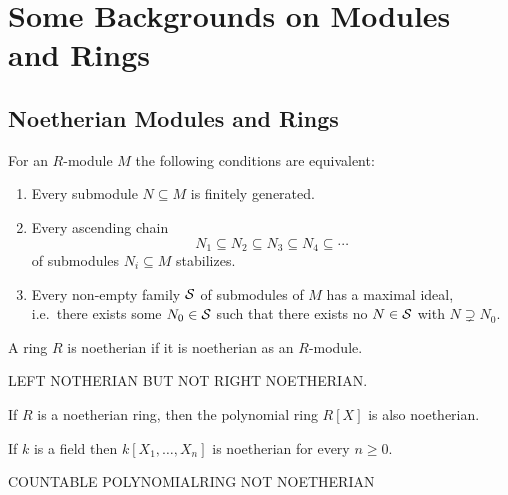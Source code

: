 \section{Some Backgrounds on Modules and Rings}




\subsection{Noetherian Modules and Rings}


\begin{lemma}
  For an $R$-module $M$ the following conditions are equivalent:
  \begin{enumerate}
    \item
      Every submodule $N \subseteq M$ is finitely generated.
    \item
      Every ascending chain
      \[
                  N_1
        \subseteq N_2
        \subseteq N_3
        \subseteq N_4
        \subseteq \dotsb
      \]
      of submodules $N_i \subseteq M$ stabilizes.
    \item
      Every non-empty family $\mathcal{S}$ of submodules of $M$ has a maximal ideal, i.e.\ there exists some $N_0 \in \mathcal{S}$ such that there exists no $N \in \mathcal{S}$ with $N \supsetneq N_0$.
  \end{enumerate}
\end{lemma}


\begin{definition}
  A ring $R$ is noetherian if it is noetherian as an $R$-module.
\end{definition}


\begin{example}
  LEFT NOTHERIAN BUT NOT RIGHT NOETHERIAN.
\end{example}



\begin{theorem}
  If $R$ is a noetherian ring, then the polynomial ring $R[X]$ is also noetherian.
\end{theorem}


\begin{example}
  If $k$ is a field then $k[X_1, \dotsc, X_n]$ is noetherian for every $n \geq 0$.
\end{example}


\begin{example}
  COUNTABLE POLYNOMIALRING NOT NOETHERIAN
\end{example}






